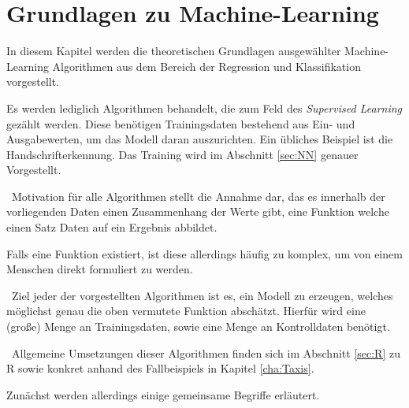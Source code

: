 \chapter{Grundlagen zu Machine-Learning}
\label{cha:MachineLearning}
\label{cha:Theorie}
In diesem Kapitel werden die theoretischen Grundlagen ausgewählter Machine-Learning Algorithmen aus dem Bereich der Regression und Klassifikation vorgestellt. 

Es werden lediglich Algorithmen behandelt, die zum Feld des \textit{Supervised Learning} gezählt werden. Diese benötigen Trainingsdaten bestehend aus Ein- und Ausgabewerten, um das Modell daran auszurichten. Ein übliches Beispiel ist die Handschrifterkennung. Das Training wird im Abschnitt \ref{sec:NN} genauer Vorgestellt. 

~\newline Motivation für alle Algorithmen stellt die Annahme dar, das es innerhalb der vorliegenden Daten einen Zusammenhang der Werte gibt, eine Funktion welche einen Satz Daten auf ein Ergebnis abbildet. 

Falls eine Funktion existiert, ist diese allerdings häufig zu komplex, um von einem Menschen direkt formuliert zu werden.   

~\newline Ziel jeder der vorgestellten Algorithmen ist es, ein Modell zu erzeugen, welches möglichst genau die oben vermutete Funktion abschätzt. Hierfür wird eine (große) Menge an Trainingsdaten, sowie eine Menge an Kontrolldaten benötigt.   

~\newline Allgemeine Umsetzungen dieser Algorithmen finden sich im Abschnitt \ref{sec:R} zu R sowie konkret anhand des Fallbeispiels in Kapitel \ref{cha:Taxis}. 

Zunächst werden allerdings einige gemeinsame Begriffe erläutert. 



